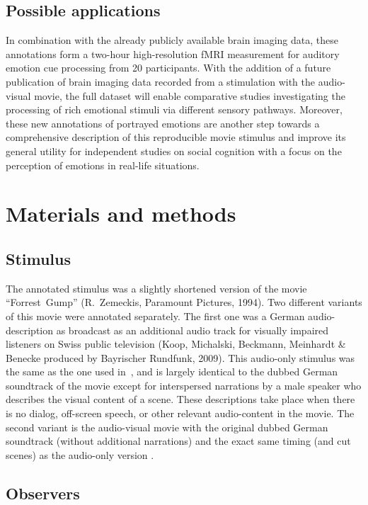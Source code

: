 \documentclass[10pt,a4paper,twocolumn]{article}
\begin{document}
\subsection*{Possible applications}

In combination with the already publicly available brain imaging data, these
annotations form a two-hour high-resolution fMRI measurement for auditory
emotion cue processing from 20 participants. With the addition of a future
publication of brain imaging data recorded from a stimulation with the
audio-visual movie, the full dataset will enable comparative studies
investigating the processing of rich emotional stimuli via different sensory
pathways. Moreover, these new annotations of portrayed emotions are another
step towards a comprehensive description of this reproducible movie
stimulus\cite{HBI+14} and improve its general utility for independent studies
on social cognition with a focus on the perception of emotions in real-life
situations.


\section*{Materials and methods} 

\subsection*{Stimulus}

The annotated stimulus was a slightly shortened version of the movie
``Forrest~Gump'' (R.~Zemeckis, Paramount Pictures, 1994). Two different
variants of this movie were annotated separately. The first one was a German
audio-description as broadcast as an additional audio track for visually
impaired listeners on Swiss public television (Koop, Michalski, Beckmann,
Meinhardt \& Benecke produced by Bayrischer Rundfunk, 2009). This audio-only
stimulus was the same as the one used in~\cite{HBI+14}, and is largely
identical to the dubbed German soundtrack of the movie except for interspersed
narrations by a male speaker who describes the visual content of a scene. These
descriptions take place when there is no dialog, off-screen speech, or other
relevant audio-content in the movie. The second variant is the audio-visual
movie with the original dubbed German soundtrack (without additional
narrations) and the exact same timing (and cut scenes) as the audio-only
version \cite[contains instructions on how to reproduce the stimulus from the
DVD release]{HBI+14}.

\subsection*{Observers}
\end{document}
